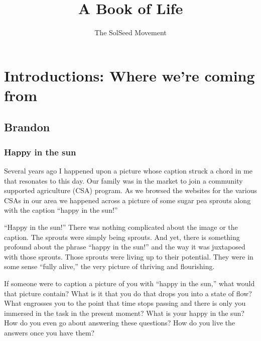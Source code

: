 \documentclass[ebook,12pt,openany,twoside]{memoir}
\newcommand{\imagefacingchapter}[1]{
  \cleartoverso
  \clearpage \null
  \thispagestyle{cleared}
  \AddToShipoutPictureBG*{%
    \AtStockLowerLeft{%
      \texttt{[image: \#1]}
    }
  }
  \clearpage
}
\begin{document}
\title{\textbf{A Book of Life}}
\author{The SolSeed Movement}
\begin{titlingpage}
\maketitle
\end{titlingpage}



\nopartblankpage
\part*{Introductions: Where we're coming from}
\imagefacingchapter{images/sprout-is-happy-in-the-sun}
\chapter*{Brandon}
\pagestyle{plain}

\section*{Happy in the sun}

Several years ago I happened upon a picture whose caption struck a chord in me
that resonates to this day. Our family was in the market to join a community
supported agriculture (CSA) program. As we browsed the websites for the various
CSAs in our area we happened across a picture of some sugar pea sprouts along
with the caption ``happy in the sun!''

``Happy in the sun!'' There was nothing complicated about the image or the
caption. The sprouts were simply being sprouts. And yet, there is something
profound about the phrase ``happy in the sun!'' and the way it was juxtaposed
with those sprouts. Those sprouts were living up to their potential. They were
in some sense ``fully alive,'' the very picture of thriving and flourishing.

If someone were to caption a picture of you with ``happy in the sun,'' what
would that picture contain? What is it that you do that drops you into a state
of flow? What engrosses you to the point that time stops passing and there is
only you immersed in the task in the present moment? What is your happy in the
sun? How do you even go about answering these questions? How do you live the
answers once you have them?
\end{document}
